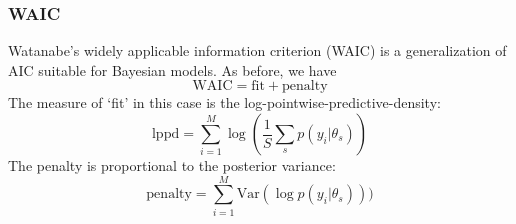 \documentclass[color=usenames,dvipsnames]{beamer}\usepackage[]{graphicx}\usepackage[]{xcolor}
\begin{document}
\begin{frame}
  \frametitle{WAIC}
  Watanabe's widely applicable information criterion (WAIC) is a
  generalization of AIC suitable for Bayesian models. %
  \pause
  As before, we have 
  \[
    \mathrm{WAIC} = \mathrm{fit} + \mathrm{penalty}
  \]
  \pause
  \vfill
  The measure of `fit' in this case is the
  log-pointwise-predictive-density:
  \[
     \mathrm{lppd} = \sum_{i=1}^M \log\left(\frac{1}{S} \sum_s p(y_i|\theta_s)\right)
  \]
  \pause
  \vfill
  The penalty is proportional to the posterior variance:
  \[
     \mathrm{penalty} = \sum_{i=1}^M \mathrm{Var}(\log p(y_i|\theta_s)))
  \]
\end{frame}
\end{document}
